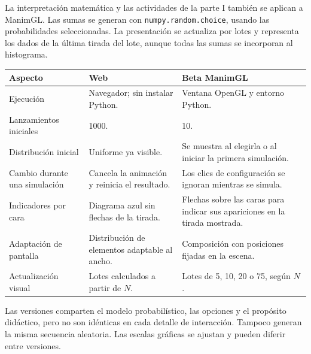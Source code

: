 \documentclass[11pt,a4paper]{article}
\begin{document}
La interpretación matemática y las actividades de la parte I también se aplican a ManimGL. Las sumas se generan con \texttt{numpy.random.choice}, usando las probabilidades seleccionadas. La presentación se actualiza por lotes y representa los dados de la última tirada del lote, aunque todas las sumas se incorporan al histograma.

\begin{tabularx}{\textwidth}{@{}p{34mm}Y Y@{}}\toprule
\textbf{Aspecto} & \textbf{Web} & \textbf{Beta ManimGL}\\\midrule
Ejecución & Navegador; sin instalar Python. & Ventana OpenGL y entorno Python.\\
Lanzamientos iniciales & 1000. & 10.\\
Distribución inicial & Uniforme ya visible. & Se muestra al elegirla o al iniciar la primera simulación.\\
Cambio durante una simulación & Cancela la animación y reinicia el resultado. & Los clics de configuración se ignoran mientras se simula.\\
Indicadores por cara & Diagrama azul sin flechas de la tirada. & Flechas sobre las caras para indicar sus apariciones en la tirada mostrada.\\
Adaptación de pantalla & Distribución de elementos adaptable al ancho. & Composición con posiciones fijadas en la escena.\\
Actualización visual & Lotes calculados a partir de $N$. & Lotes de 5, 10, 20 o 75, según $N$.\\\bottomrule
\end{tabularx}

Las versiones comparten el modelo probabilístico, las opciones y el propósito didáctico, pero no son idénticas en cada detalle de interacción. Tampoco generan la misma secuencia aleatoria. Las escalas gráficas se ajustan y pueden diferir entre versiones.
\end{document}
